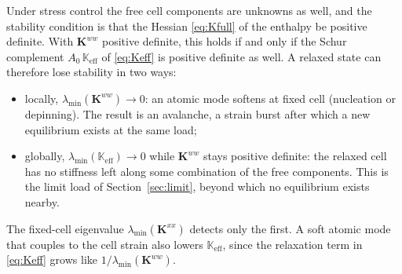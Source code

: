 \documentclass[11pt,a4paper]{article}
\begin{document}
Under stress control the free cell components are unknowns as well, and the stability condition
is that the Hessian \eqref{eq:Kfull} of the enthalpy be positive definite. With \(\mathbf K^{ww}\)
positive definite, this holds if and only if the Schur complement \(A_0\,\mathbb K_{\mathrm{eff}}\)
of \eqref{eq:Keff} is positive definite as well. A relaxed state can therefore lose stability in two
ways:
\begin{itemize}
\item locally, \(\lambda_{\min}(\mathbf K^{ww})\to0\): an atomic mode softens at fixed cell (nucleation
or depinning). The result is an avalanche, a strain burst after which a new equilibrium exists at
the same load;
\item globally, \(\lambda_{\min}(\mathbb K_{\mathrm{eff}})\to0\) while \(\mathbf K^{ww}\) stays positive
definite: the relaxed cell has no stiffness left along some combination of the free components.
This is the limit load of Section~\ref{sec:limit}, beyond which no equilibrium exists nearby.
\end{itemize}
The fixed-cell eigenvalue \(\lambda_{\min}(\mathbf K^{xx})\) detects only the first. A soft atomic
mode that couples to the cell strain also lowers \(\mathbb K_{\mathrm{eff}}\), since the relaxation
term in \eqref{eq:Keff} grows like \(1/\lambda_{\min}(\mathbf K^{ww})\).
\end{document}
